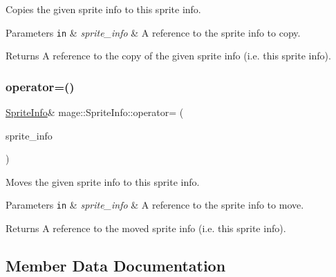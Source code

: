 Copies the given sprite info to this sprite info.


\begin{DoxyParams}[1]{Parameters}
\mbox{\tt in}  & {\em sprite\+\_\+info} & A reference to the sprite info to copy. \\
\hline
\end{DoxyParams}
\begin{DoxyReturn}{Returns}
A reference to the copy of the given sprite info (i.\+e. this sprite info). 
\end{DoxyReturn}
\hypertarget{structmage_1_1_sprite_info_ae504d8d63f6cabd0f9c9c28833bb9366}{}\label{structmage_1_1_sprite_info_ae504d8d63f6cabd0f9c9c28833bb9366} 
\subsubsection{\texorpdfstring{operator=()}{operator=()}\hspace{0.1cm}{\footnotesize\ttfamily [2/2]}}
{\footnotesize\ttfamily \hyperlink{structmage_1_1_sprite_info}{Sprite\+Info}\& mage\+::\+Sprite\+Info\+::operator= (\begin{DoxyParamCaption}\item[{\hyperlink{structmage_1_1_sprite_info}{Sprite\+Info} \&\&}]{sprite\+\_\+info }\end{DoxyParamCaption})\hspace{0.3cm}{\ttfamily [default]}}

Moves the given sprite info to this sprite info.


\begin{DoxyParams}[1]{Parameters}
\mbox{\tt in}  & {\em sprite\+\_\+info} & A reference to the sprite info to move. \\
\hline
\end{DoxyParams}
\begin{DoxyReturn}{Returns}
A reference to the moved sprite info (i.\+e. this sprite info). 
\end{DoxyReturn}


\subsection{Member Data Documentation}
\hypertarget{structmage_1_1_sprite_info_a84baaa1612a26bcc076965c0997641c3}{}\label{structmage_1_1_sprite_info_a84baaa1612a26bcc076965c0997641c3} 
